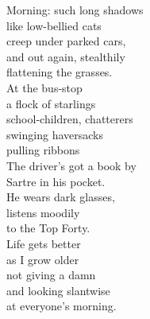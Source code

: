 \documentclass{article}
\begin{document}
\vspace*{\fill}
\centering
\begin{minipage}{5cm}

    Morning: such long shadows\\
    like low-bellied cats\\
    creep under parked cars,\\
    and out again, stealthily\\
    flattening the grasses.\\

    At the bus-stop\\
    a flock of starlings\\
    school-children, chatterers\\
    swinging haversacks\\
    pulling ribbons\\

    The driver's got a book by\\
    Sartre in his pocket.\\
    He wears dark glasses,\\
    listens moodily\\
    to the Top Forty.\\

    Life gets better\\
    as I grow older\\
    not giving a damn\\
    and looking slantwise\\
    at everyone's morning.\\


\end{minipage}

\vspace*{\fill}
\end{document}
